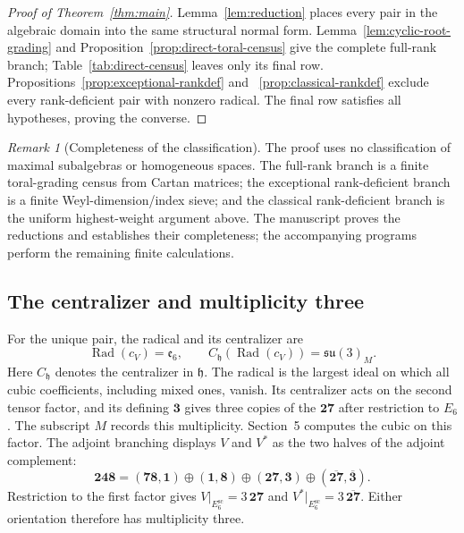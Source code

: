 \documentclass[11pt]{article}
\theoremstyle{remark}
\newtheorem*{remark}{Remark}
\newcommand{\h}{\mathfrak h}
\newcommand{\e}{\mathfrak e}
\newcommand{\su}{\mathfrak{su}}
\newcommand{\Rad}{\operatorname{Rad}}
\begin{document}
\begin{proof}[Proof of Theorem~\ref{thm:main}]
Lemma~\ref{lem:reduction} places every pair in the algebraic domain
into the same structural normal form.
Lemma~\ref{lem:cyclic-root-grading} and
Proposition~\ref{prop:direct-toral-census} give the complete full-rank branch;
Table~\ref{tab:direct-census} leaves only its final row.
Propositions~\ref{prop:exceptional-rankdef} and~
\ref{prop:classical-rankdef} exclude every rank-deficient pair with nonzero
radical.  The final row satisfies all hypotheses, proving the converse.
\end{proof}

\begin{remark}[Completeness of the classification]
The proof uses no classification of maximal subalgebras or homogeneous
spaces.  The full-rank branch is a finite toral-grading census from Cartan
matrices; the exceptional rank-deficient branch is a finite
Weyl-dimension/index sieve; and the classical rank-deficient branch is the
uniform highest-weight argument above. The manuscript proves the reductions
and establishes their completeness; the accompanying programs perform the
remaining finite calculations.
\end{remark}


\subsection{The centralizer and multiplicity three}
For the unique pair, the radical and its centralizer are
\[
 \Rad(c_V)=\e_6,
 \qquad C_{\h}(\Rad(c_V))=\su(3)_M.
\]
Here \(C_{\h}\) denotes the centralizer in \(\h\). The radical is the
largest ideal on which all cubic coefficients, including mixed ones, vanish.
Its centralizer acts on the second tensor factor, and its defining
\(\mathbf3\) gives three copies of the \(\mathbf{27}\) after restriction to
\(E_6\). The subscript \(M\) records this multiplicity.
Section~5 computes the cubic on this factor. The adjoint branching
displays \(V\) and \(V^*\) as the two halves of the adjoint complement:
\begin{equation}
\tag{7}
\mathbf{248}=(\mathbf{78},\mathbf1)\oplus(\mathbf1,\mathbf8)
 \oplus(\mathbf{27},\mathbf3)
 \oplus(\overline{\mathbf{27}},\overline{\mathbf3}).
\label{eq:e8branch}
\end{equation}
Restriction to the first factor gives
\(V|_{E_6^{\mathrm{sc}}}=3\,\mathbf{27}\) and
\(V^*|_{E_6^{\mathrm{sc}}}=3\,\overline{\mathbf{27}}\). Either orientation
therefore has multiplicity three.
\end{document}
